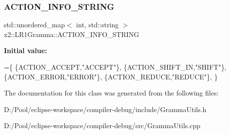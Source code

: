 \subsubsection{\texorpdfstring{A\+C\+T\+I\+O\+N\+\_\+\+I\+N\+F\+O\+\_\+\+S\+T\+R\+I\+NG}{ACTION\_INFO\_STRING}}
{\footnotesize\ttfamily std\+::unordered\+\_\+map$<$ int, std\+::string $>$ x2\+::\+L\+R1\+Gramma\+::\+A\+C\+T\+I\+O\+N\+\_\+\+I\+N\+F\+O\+\_\+\+S\+T\+R\+I\+NG\hspace{0.3cm}{\ttfamily [static]}}

{\bfseries Initial value\+:}
\begin{DoxyCode}
=\{
          \{ACTION\_ACCEPT,\textcolor{stringliteral}{"ACCEPT"}\},
          \{ACTION\_SHIFT\_IN,\textcolor{stringliteral}{"SHIFT"}\},
          \{ACTION\_ERROR,\textcolor{stringliteral}{"ERROR"}\},
          \{ACTION\_REDUCE,\textcolor{stringliteral}{"REDUCE"}\},
  \}
\end{DoxyCode}


The documentation for this class was generated from the following files\+:\begin{DoxyCompactItemize}
\item 
D\+:/\+Pool/eclipse-\/workspace/compiler-\/debug/include/Gramma\+Utils.\+h\item 
D\+:/\+Pool/eclipse-\/workspace/compiler-\/debug/src/Gramma\+Utils.\+cpp\end{DoxyCompactItemize}
